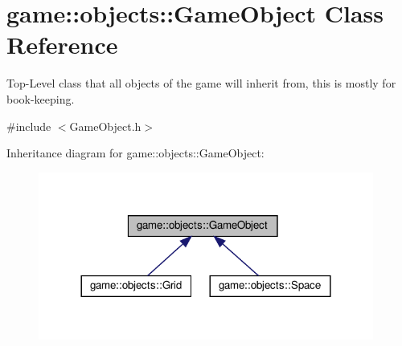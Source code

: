 \hypertarget{classgame_1_1objects_1_1GameObject}{}\section{game\+:\+:objects\+:\+:Game\+Object Class Reference}
\label{classgame_1_1objects_1_1GameObject}


Top-\/\+Level class that all objects of the game will inherit from, this is mostly for book-\/keeping.  




{\ttfamily \#include $<$Game\+Object.\+h$>$}



Inheritance diagram for game\+:\+:objects\+:\+:Game\+Object\+:\nopagebreak
\begin{figure}[H]
\begin{center}
\leavevmode
\includegraphics[width=312pt]{classgame_1_1objects_1_1GameObject__inherit__graph}
\end{center}
\end{figure}
